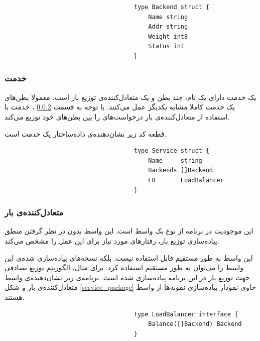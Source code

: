 \begin{latin}
    \begin{lstlisting}
                                    type Backend struct {
                                        Name string
                                        Addr string
                                        Weight int8
                                        Status int
                                    }
    \end{lstlisting}
\end{latin}


\subsubsection{خدمت}
یک خدمت دارای یک نام، چند بطن و یک متعادل‌کننده‌ی توزیع بار است. معمولا بطن‌های یک خدمت کاملا مشابه یکدیگر عمل می‌کنند. با توجه به قسمت
\ref{subsubsec:impl_loadbalancer}
، خدمت با استفاده از متعادل‌کننده‌ی بار درخواست‌های را بین بطن‌های خود توزیع می‌کند.

قطعه کد زیر نشان‌دهنده‌ی داده‌ساختار یک خدمت است.

\begin{latin}
    \begin{lstlisting}
                                    type Service struct {
                                        Name     string
                                        Backends []Backend
                                        LB       LoadBalancer
                                    }
    \end{lstlisting}
\end{latin}

\subsubsection{متعادل‌کننده‌ی بار}\label{subsubsec:impl_loadbalancer}
این موجودیت در برنامه از نوع یک واسط
است. این واسط بدون در نظر گرفتن منطق پیاده‌سازی توزیع بار، رفتار‌های مورد نیاز برای این عمل را مشخص می‌کند.

این واسط به طور مستقیم قابل استفاده نیست. بلکه نسخه‌های پیاده‌سازی شده‌ی این واسط را می‌توان به طور مستقیم استفاده کرد. برای مثال، الگوریتم توزیع تصادفی جهت توزیع بار در این برنامه پیاده‌سازی شده است. برنامه‌ی زیر نشان‌دهنده‌ی واسط متعادل‌کننده‌ی بار و شکل
\ref{service_package}
حاوی نمودار پیاده‌سازی نمونه‌ها از واسط هستند.


\begin{latin}
    \begin{lstlisting}
                                    type LoadBalancer interface {
                                        Balance([]Backend) Backend
                                    }
    \end{lstlisting}
\end{latin}


